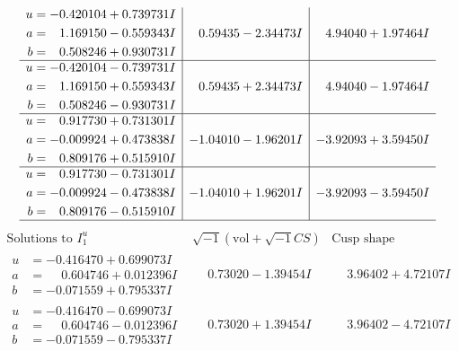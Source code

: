 \documentclass[1p]{elsarticle_modified}
\theoremstyle{definition}
\newcommand{\I}{\sqrt{-1}}
\begin{document}
$$\begin{array}{c|c|c}
\begin{aligned}
u &= -0.420104 + 0.739731 I \\
a &= \phantom{-}1.169150 - 0.559343 I \\
b &= \phantom{-}0.508246 + 0.930731 I\end{aligned}
 & \phantom{-}0.59435 - 2.34473 I & \phantom{-}4.94040 + 1.97464 I \\ \hline\begin{aligned}
u &= -0.420104 - 0.739731 I \\
a &= \phantom{-}1.169150 + 0.559343 I \\
b &= \phantom{-}0.508246 - 0.930731 I\end{aligned}
 & \phantom{-}0.59435 + 2.34473 I & \phantom{-}4.94040 - 1.97464 I \\ \hline\begin{aligned}
u &= \phantom{-}0.917730 + 0.731301 I \\
a &= -0.009924 + 0.473838 I \\
b &= \phantom{-}0.809176 + 0.515910 I\end{aligned}
 & -1.04010 - 1.96201 I & -3.92093 + 3.59450 I \\ \hline\begin{aligned}
u &= \phantom{-}0.917730 - 0.731301 I \\
a &= -0.009924 - 0.473838 I \\
b &= \phantom{-}0.809176 - 0.515910 I\end{aligned}
 & -1.04010 + 1.96201 I & -3.92093 - 3.59450 I\\
 \hline 
 \end{array}$$\newpage$$\begin{array}{c|c|c}  
\text{Solutions to }I^u_{1}& \I (\text{vol} + \sqrt{-1}CS) & \text{Cusp shape}\\
 \hline 
\begin{aligned}
u &= -0.416470 + 0.699073 I \\
a &= \phantom{-}0.604746 + 0.012396 I \\
b &= -0.071559 + 0.795337 I\end{aligned}
 & \phantom{-}0.73020 - 1.39454 I & \phantom{-}3.96402 + 4.72107 I \\ \hline\begin{aligned}
u &= -0.416470 - 0.699073 I \\
a &= \phantom{-}0.604746 - 0.012396 I \\
b &= -0.071559 - 0.795337 I\end{aligned}
 & \phantom{-}0.73020 + 1.39454 I & \phantom{-}3.96402 - 4.72107 I \\ \hline\begin{aligned}

\end{aligned}
\end{array}$$
\end{document}
